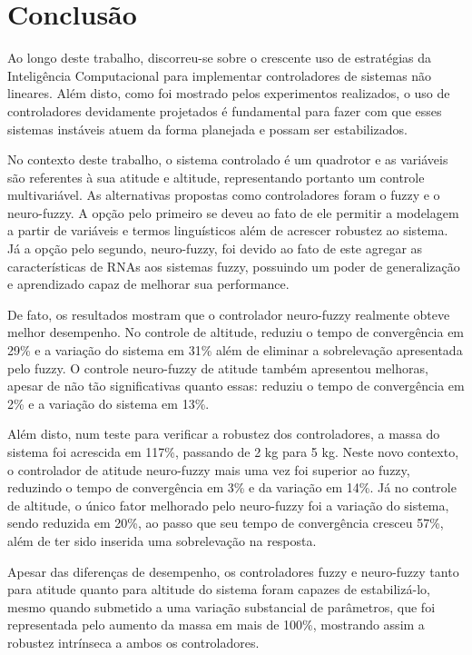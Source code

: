 %
%

\chapter{Conclusão}
\label{chap:conclusao}

Ao longo deste trabalho, discorreu-se sobre o crescente uso de estratégias da Inteligência Computacional para implementar controladores de sistemas não lineares. Além disto, como foi mostrado pelos experimentos realizados, o uso de controladores devidamente projetados é fundamental para fazer com que esses sistemas instáveis atuem da forma planejada e possam ser estabilizados.

No contexto deste trabalho, o sistema controlado é um quadrotor e as variáveis são referentes à sua atitude e altitude, representando portanto um controle multivariável. As alternativas propostas como controladores foram o fuzzy e o neuro-fuzzy. A opção pelo primeiro se deveu ao fato de ele permitir a modelagem a partir de variáveis e termos linguísticos além de acrescer robustez ao sistema. Já a opção pelo segundo, neuro-fuzzy, foi devido ao fato de este agregar as características de RNAs aos sistemas fuzzy, possuindo um poder de generalização e aprendizado capaz de melhorar sua performance.

De fato, os resultados mostram que o controlador neuro-fuzzy realmente obteve melhor desempenho. No controle de altitude, reduziu o tempo de convergência em 29\% e a variação do sistema em 31\% além de eliminar a sobrelevação apresentada pelo fuzzy. O controle neuro-fuzzy de atitude também apresentou melhoras, apesar de não tão significativas quanto essas: reduziu o tempo de convergência em 2\% e a variação do sistema em 13\%.

Além disto, num teste para verificar a robustez dos controladores, a massa do sistema foi acrescida em 117\%, passando de 2 kg para 5 kg. Neste novo contexto, o controlador de atitude neuro-fuzzy mais uma vez foi superior ao fuzzy, reduzindo o tempo de convergência em 3\% e da variação em 14\%. Já no controle de altitude, o único fator melhorado pelo neuro-fuzzy foi a variação do sistema, sendo reduzida em 20\%, ao passo que seu tempo de convergência cresceu 57\%, além de ter sido inserida uma sobrelevação na resposta.

Apesar das diferenças de desempenho, os controladores fuzzy e neuro-fuzzy tanto para atitude quanto para altitude do sistema foram capazes de estabilizá-lo, mesmo quando submetido a uma variação substancial de parâmetros, que foi representada pelo aumento da massa em mais de 100\%, mostrando assim a robustez intrínseca a ambos os controladores.

